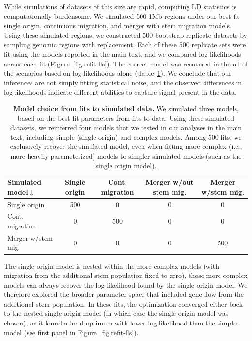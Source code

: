\documentclass[]{article}
\begin{document}
While simulations of datasets of this size are rapid, computing LD statistics
is computationally burdensome. We simulated 500 1Mb regions under our best fit
single origin, continuous migration, and merger with stem migration models.
Using these simulated regions, we constructed 500 bootstrap replicate datasets
by sampling genomic regions with replacement. Each of these 500 replicate sets were fit using
the models reported in the main text, and we compared log-likelihoods across
each fit (Figure~\ref{fig:refit-lls}). The correct model was recovered in the
all of the scenarios based on log-likelihoods alone
(Table~\ref{tab:confusion-matrix}). We conclude that our inferences are not
simply fitting statistical noise, and the observed differences in
log-likelihoods indicate different abilities to capture signal present in the data. 

\begin{table}[ht]
    \caption{
        \label{tab:confusion-matrix}
        \textbf{Model choice from fits to simulated data.} We simulated three
        models, based on the best fit parameters from fits to data. Using these
        simulated datasets, we reinferred four models that we tested in our
        analyses in the main text, including simple (single origin) and complex
        models. Among 500 fits, we exclusively recover the simulated
        model, even when fitting more complex (i.e., more heavily
        parameterized) models to simpler simulated models (such as the single
        origin model).
    }
    \centering
    \begin{tabular}[t]{lcccc}
        \toprule
        Simulated model$\downarrow$ & Single origin & Cont. migration & Merger w/out stem mig. & Merger w/stem mig. \\
        \midrule
        Single origin & 500 & 0 & 0 & 0 \\
        Cont. migration & 0 & 500 & 0 & 0 \\
        Merger w/stem mig. & 0 & 0 & 0 & 500 \\
        \bottomrule
    \end{tabular}
\end{table}

The single origin model is nested within the more complex models (with
migration from the additional stem population fixed to zero), those more
complex models can always recover the log-likelihood found by the single origin
model. We therefore explored the broader parameter space that included gene
flow from the additional stem population. In these fits, the optimization
converged either back to the nested single origin model (in which case the
single origin model was chosen), or it found a local optimum with lower
log-likelihood than the simpler model (see first panel in
Figure~\ref{fig:refit-lls}).
\end{document}
